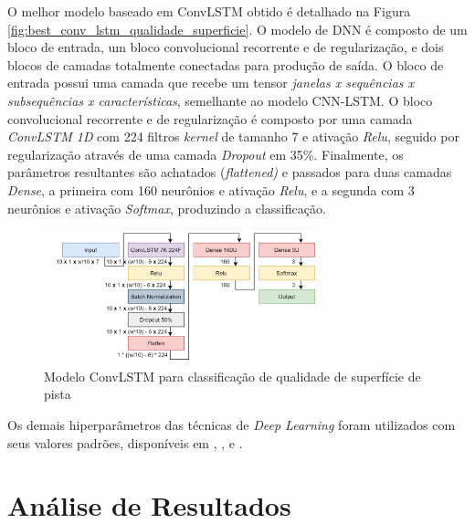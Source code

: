 O melhor modelo baseado em ConvLSTM obtido é detalhado na Figura \autoref{fig:best_conv_lstm_qualidade_superficie}. O modelo de DNN é composto de um bloco de entrada, um bloco convolucional recorrente e de regularização, e dois blocos de camadas totalmente conectadas para produção de saída. O bloco de entrada possui uma camada que recebe um tensor \emph{janelas x sequências x subsequências x características}, semelhante ao modelo CNN-LSTM. O bloco convolucional recorrente e de regularização é composto por uma camada \textit{ConvLSTM 1D} com 224 filtros \textit{kernel} de tamanho 7 e ativação \textit{Relu}, seguido por regularização através de uma camada \textit{Dropout} em 35\%. Finalmente, os parâmetros resultantes são achatados (\textit{flattened)} e passados para duas camadas \textit{Dense}, a primeira com 160 neurônios e ativação \textit{Relu}, e a segunda com 3 neurônios e ativação \textit{Softmax}, produzindo a classificação.

\begin{figure}[ht!]
  \centering
  \caption{Modelo ConvLSTM para classificação de qualidade de superfície de pista}
  \label{fig:best_conv_lstm_qualidade_superficie}
  \includegraphics[width=0.7\textwidth]{figuras/fig_50.png}
\end{figure}

Os demais hiperparâmetros das técnicas de \textit{Deep Learning} foram utilizados com seus valores padrões, disponíveis em , ,  e .

\section{Análise de Resultados}

